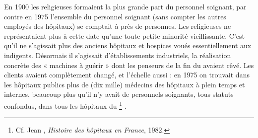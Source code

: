  En 1900 les religieuses formaient la plus grande part du personnel soignant, par contre en 1975 l'ensemble du personnel soignant (sans compter les autres employés des hôpitaux) se comptait à près de  personnes. Les religieuses ne représentaient plus à cette date qu'une toute petite minorité vieillissante. C'est qu'il ne s'agissait plus des anciens hôpitaux et hospices voués essentiellement aux indigents. Désormais il s'agissait d'établissements industriels, la réalisation concrète des « machines à guérir » dont les penseurs de la fin du  avaient rêvé. Les clients avaient complètement changé, et l'échelle aussi : en 1975 on trouvait dans les hôpitaux publics plus de  (dix mille) médecins des hôpitaux à plein temps et  internes, beaucoup plus qu'il n'y avait de personnels soignants, tous statuts confondus, dans tous les hôpitaux du %
\footnote{Cf. Jean , \emph{Histoire des hôpitaux en France}, 1982.}%
.



